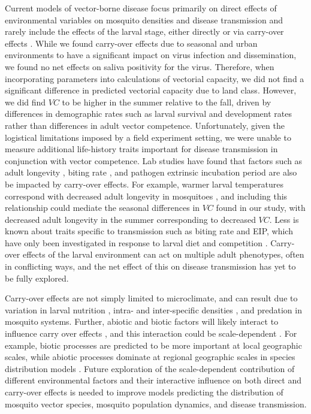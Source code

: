 \documentclass[doublespacing, linenumbers]{bmcart}
\begin{document}
Current models of vector-borne disease focus primarily on direct effects of environmental variables on mosquito densities and disease transmission and rarely include the effects of the larval stage, either directly or via carry-over effects \cite{reiner2013}.
While we found carry-over effects due to seasonal and urban environments to have a significant impact on virus infection and dissemination, we found no net effects on saliva positivity for the virus.
Therefore, when incorporating parameters into calculations of vectorial capacity, we did not find a significant difference in predicted vectorial capacity due to land class.
However, we did find $VC$ to be higher in the summer relative to the fall, driven by differences in demographic rates such as larval survival and development rates rather than differences in adult vector competence.
Unfortunately, given the logistical limitations imposed by a field experiment setting, we were unable to measure additional life-history traits important for disease transmission in conjunction with vector competence.
Lab studies have found that factors such as adult longevity \cite{christiansen-jucht2014}, biting rate \cite{moller-jacobs2014}, and pathogen extrinsic incubation period \cite{shapiro2016, bara2015} are also be impacted by carry-over effects.
For example, warmer larval temperatures correspond with decreased adult longevity in mosquitoes \cite{christiansen-jucht2014}, and including this relationship could mediate the seasonal differences in $VC$ found in our study, with decreased adult longevity in the summer corresponding to decreased $VC$.
Less is known about traits specific to transmission such as biting rate and EIP, which have only been investigated in response to larval diet and competition \cite{moller-jacobs2014,shapiro2016, bara2015}.
Carry-over effects of the larval environment can act on multiple adult phenotypes, often in conflicting ways, and the net effect of this on disease transmission has yet to be fully explored.

Carry-over effects are not simply limited to microclimate, and can result due to variation in larval nutrition \cite{moller-jacobs2014}, intra- and inter-specific densities \cite{alto2005}, and predation \cite{roux2015a} in mosquito systems.
Further, abiotic and biotic factors will likely interact to influence carry over effects \cite{buckner2016, muturi2012a}, and this interaction could be scale-dependent \cite{leisnham2014}.
For example, biotic processes are predicted to be more important at local geographic scales, while abiotic processes dominate at regional geographic scales in species distribution models \cite{cohen2016}.
Future exploration of the scale-dependent contribution of different environmental factors and their interactive influence on both direct and carry-over effects is needed to improve models predicting the distribution of mosquito vector species, mosquito population dynamics, and disease transmission.
\end{document}
